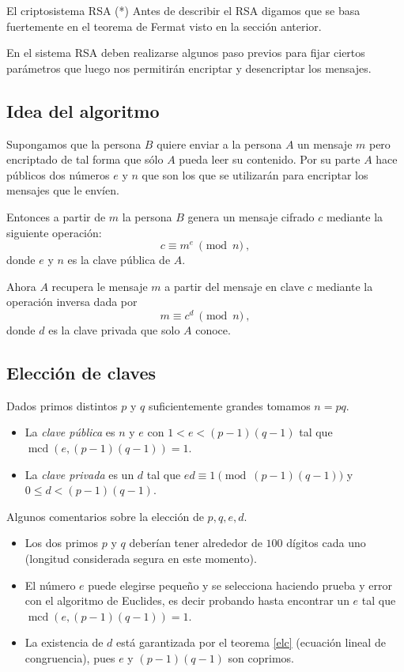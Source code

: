 \begin{section}{El criptosistema RSA (*)}
Antes de describir el RSA digamos que se basa fuertemente en el teorema de Fermat visto en la sección anterior. 


En el sistema RSA deben realizarse algunos paso previos para fijar ciertos parámetros que luego nos permitirán encriptar y desencriptar los mensajes.



\subsection*{Idea del  algoritmo}

Supongamos que la persona $B$  quiere enviar a la persona $A$ un mensaje $m$ pero encriptado de tal forma que sólo $A$ pueda leer su contenido. Por su parte $A$ hace públicos dos números $e$ y $n$ que son los que se utilizarán para encriptar los mensajes que le envíen. 

Entonces a partir de $m$ la persona $B$ genera un mensaje cifrado $c$ mediante la siguiente ope\-ra\-ción:
$$
    c\equiv m^e\ \pmod{n}\ ,
$$
donde $e$ y $n$ es la clave pública de $A$.

Ahora $A$ recupera le mensaje $m$ a partir del mensaje en clave $c$ mediante la operación inversa dada por
$$
    m\equiv c^d\ \pmod{n}\ ,
$$
donde $d$ es la clave privada que solo $A$ conoce.




\subsection*{Elección de claves}



Dados primos distintos $p$ y $q$ suficientemente grandes tomamos $n = pq$. 
\begin{itemize}
    \item  La \emph{clave pública} es $n$ y $e$ con $1 < e < (p-1)(q-1)$ tal que $\operatorname{mcd}(e, (p-1)(q-1)) = 1$. 
    \item  La \emph{clave privada} es un $d$ tal que $ed \equiv 1 \pmod{(p-1)(q-1)}$ y $0 \le d <(p-1)(q-1)$.
\end{itemize}


\begin{observacion*} Algunos comentarios sobre la elección de $p,q,e,d$.
\begin{itemize}
\item
Los dos primos $p$ y $q$ deberían tener alrededor de $100$ dígitos cada uno (longitud considerada segura en este momento).
\item
El número $e$ puede elegirse pequeño y se selecciona haciendo prueba y error con el algoritmo de Euclides, es decir probando hasta encontrar un $e$ tal que $\operatorname{mcd}(e, (p-1)(q-1)) = 1$.
\item
La existencia de $d$ está garantizada por el teorema \ref{elc} (ecuación lineal de congruencia), pues $e$ y $(p-1)(q-1)$ son coprimos.
\end{itemize}


\end{observacion*}
\end{section}
